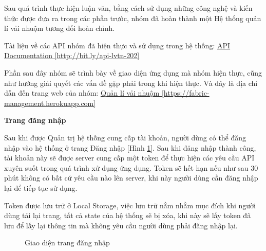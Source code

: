 Sau quá trình thực hiện luận văn, bằng cách sử dụng những công nghệ và kiến thức được đưa ra trong các phần trước, nhóm đã hoàn thành một Hệ thống quản lí vải nhuộm tương đối hoàn chỉnh.\par

Tài liệu về các API nhóm đã hiện thực và sử dụng trong hệ thống: \href{http://bit.ly/api-lvtn-202}{API Documentation [http://bit.ly/api-lvtn-202]}

Phần sau đây nhóm sẽ trình bày về giao diện ứng dụng mà nhóm hiện thực, cũng như hướng giải quyết các vấn đề gặp phải trong khi hiện thực. Và đây là địa chỉ dẫn đến trang web của nhóm: \href{https://fabric-management.herokuapp.com}{Quản lí vải nhuộm [https://fabric-management.herokuapp.com]}

\textbf{Trang đăng nhập}

Sau khi được Quản trị hệ thống cung cấp tài khoản, người dùng có thể đăng nhập vào hệ thống ở trang Đăng nhập [Hình \ref{result_dang_nhap}]. Sau khi đăng nhập thành công, tài khoản này sẽ được server cung cấp một token để thực hiện các yêu cầu API xuyên suốt trong quá trình xử dụng ứng dụng. Token sẽ hết hạn nếu như sau 30 phút không có bất cứ yêu cầu nào lên server, khi này người dùng cần đăng nhập lại để tiếp tục sử dụng.\par
Token được lưu trữ ở Local Storage, việc lưu trữ nằm nhằm mục đích khi người dùng tải lại trang, tất cả state của hệ thống sẽ bị xóa, khi này sẽ lấy token đã lưu để lấy lại thông tin mà không yêu cầu người dùng phải đăng nhập lại.
\begin{figure}[H]
    \begin{center}
        \caption{Giao diện trang đăng nhập}
        \label{result_dang_nhap}
    \end{center}
\end{figure}

